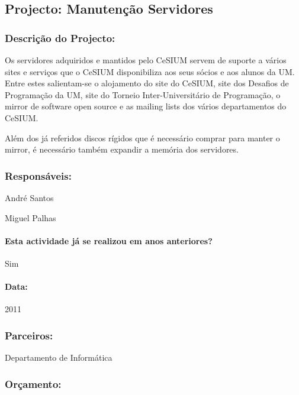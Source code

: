 \subsection{Projecto: Manutenção Servidores} %
\subsubsection*{Descrição do Projecto:}
Os servidores adquiridos e mantidos pelo CeSIUM servem de suporte a vários sites e serviços que o CeSIUM disponibiliza aos seus sócios e aos alunos da UM. Entre estes salientam-se o alojamento do site do CeSIUM, site dos Desafios de Programação da UM, site do Torneio Inter-Universitário de Programação, o mirror de software open source e as mailing lists dos vários departamentos do CeSIUM.

Além dos já referidos discos rígidos que é necessário comprar para manter o mirror, é necessário também expandir a memória dos servidores.


\subsubsection*{Responsáveis:}
\begin{itemizedash}
	\item{André Santos}
	\item{Miguel Palhas}
\end{itemizedash}

\paragraph{Esta actividade já se realizou em anos anteriores?}
Sim

\paragraph{Data:} 2011

\subsubsection*{Parceiros:}
\begin{itemizedash}
    \item{Departamento de Informática}
\end{itemizedash}

\subsubsection*{Orçamento:}

